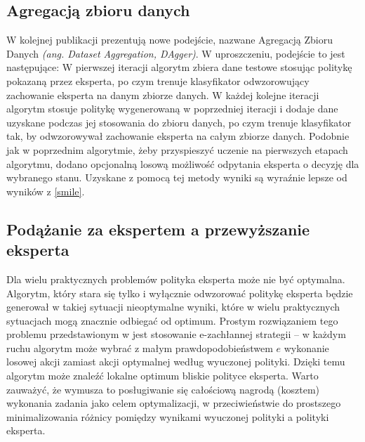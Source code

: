 \subsection{Agregacją zbioru danych}
W kolejnej publikacji \cite{DBLP:journals/corr/abs-1011-0686} prezentują nowe podejście, nazwane Agregacją Zbioru Danych \textit{(ang. Dataset Aggregation, DAgger)}. W uproszczeniu, podejście to jest następujące: W pierwszej iteracji algorytm zbiera dane testowe stosując politykę pokazaną przez eksperta, po czym trenuje klasyfikator odwzorowujący zachowanie eksperta na danym zbiorze danych. W każdej kolejne iteracji algorytm stosuje politykę wygenerowaną w poprzedniej iteracji i dodaje dane uzyskane podczas jej stosowania do zbioru danych, po czym trenuje klasyfikator tak, by odwzorowywał zachowanie eksperta na całym zbiorze danych. Podobnie jak w poprzednim algorytmie, żeby przyspieszyć uczenie na pierwszych etapach algorytmu, dodano opcjonalną losową możliwość odpytania eksperta o decyzję dla wybranego stanu. Uzyskane z pomocą tej metody wyniki są wyraźnie lepsze od wyników z \ref{smile}.

\subsection{Podążanie za ekspertem a przewyższanie eksperta}
Dla wielu praktycznych problemów polityka eksperta może nie być optymalna. Algorytm, który stara się tylko i wyłącznie odwzorować politykę eksperta będzie generował w takiej sytuacji nieoptymalne wyniki, które w wielu praktycznych sytuacjach mogą znacznie odbiegać od optimum. Prostym rozwiązaniem tego problemu przedstawionym w \cite{DBLP:journals/corr/ChangKADL15} jest stosowanie e-zachłannej strategii – w każdym ruchu algorytm może wybrać z małym prawdopodobieństwem $e$ wykonanie losowej akcji zamiast akcji optymalnej według wyuczonej polityki. Dzięki temu algorytm może znaleźć lokalne optimum bliskie polityce eksperta. Warto zauważyć, że wymusza to posługiwanie się całościową nagrodą (kosztem) wykonania zadania jako celem optymalizacji, w przeciwieństwie do prostszego minimalizowania różnicy pomiędzy wynikami wyuczonej polityki a polityki eksperta.
